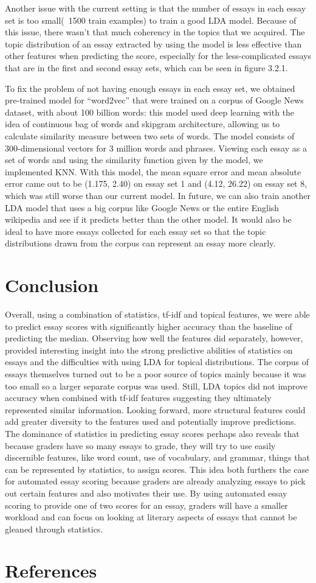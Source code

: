 \documentclass{article}
\begin{document}
Another issue with the current setting is that the number of essays in each essay set is too small(~1500 train examples) to train a good LDA model. Because of this issue, there wasn’t that much coherency in the topics that we acquired. The topic distribution of an essay extracted by using the model is less effective than other features when predicting the score, especially for the less-complicated essays that are in the first and second essay sets, which can be seen in figure 3.2.1.

To fix the problem of not having enough essays in each essay set, we obtained pre-trained model for “word2vec” that were trained on a corpus of Google News dataset, with about 100 billion words: this model used deep learning with the idea of continuous bag of words and skipgram architecture, allowing us to calculate similarity measure between two sets of words. The model consists of 300-dimensional vectors for 3 million words and phrases. Viewing each essay as a set of words and using the similarity function given by the model, we implemented KNN. With this model, the mean square error and mean absolute error came out to be (1.175, 2.40) on essay set 1 and (4.12, 26.22) on essay set 8, which was still worse than our current model. In future, we can also train another LDA model that uses a big corpus like Google News or the entire English wikipedia and see if it predicts better than the other model. It would also be ideal to have more essays collected for each essay set so that the topic distributions drawn from the corpus can represent an essay more clearly.


\section{Conclusion}
Overall, using a combination of statistics, tf-idf and topical features, we were able to predict essay scores with significantly higher accuracy than the baseline of predicting the median. Observing how well the features did separately, however, provided interesting insight into the strong predictive abilities of statistics on essays and the difficulties with using LDA for topical distributions. The corpus of essays themselves turned out to be a poor source of topics mainly because it was too small so a larger separate corpus was used. Still, LDA topics did not improve accuracy when combined with tf-idf features suggesting they ultimately represented similar information. Looking forward, more structural features could add greater diversity to the features used and potentially improve predictions. 
The dominance of statistics in predicting essay scores perhaps also reveals that because graders have so many essays to grade, they will try to use easily discernible features, like word count, use of vocabulary, and grammar, things that can be represented by statistics, to assign scores. This idea both furthers the case for automated essay scoring because graders are already analyzing essays to pick out certain features and also motivates their use. By using automated essay scoring to provide one of two scores for an essay, graders will have a smaller workload and can focus on looking at literary aspects of essays that cannot be gleaned through statistics.


\section{References}
\end{document}
